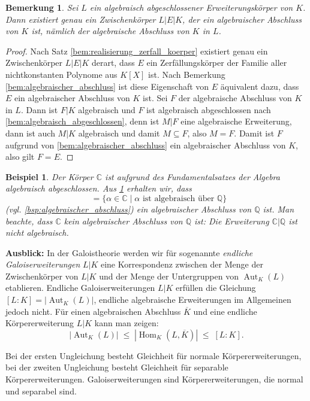 \documentclass[a4paper, twoside, 11pt, ngerman]{report}
\newcommand{\CC}{\mathds C}
\newcommand{\QQ}{\mathds Q}
\DeclareMathOperator{\alg}{alg}
\DeclareMathOperator{\Aut}{Aut}
\DeclareMathOperator{\Hom}{Hom}
\DeclareMathOperator{\QQalg}{\QQ^{\alg}}
\theoremstyle{definistyle}
\newtheorem{bem}[satz]{Bemerkung}
\newtheorem{bsp}[satz]{Beispiel}
\theoremstyle{remark}
\begin{document}
\begin{bem}\label{bem:einbettung_alg_abschluss}
Sei $L$ ein algebraisch abgeschlossener Erweiterungskörper von $K$. Dann existiert genau ein Zwischenkörper $L|E|K$, der ein algebraischer Abschluss von $K$ ist, nämlich der algebraische Abschluss von $K$ in $L$.
\end{bem}

\begin{proof}
Nach Satz \ref{bem:realisierung_zerfall_koerper} existiert genau ein Zwischenkörper $L|E|K$ derart, dass $E$ ein Zerfällungskörper der Familie aller nichtkonstanten Polynome aus $K[X]$ ist. Nach Bemerkung \ref{bem:algebraischer_abschluss} ist diese Eigenschaft von $E$ äquivalent dazu, dass $E$ ein algebraischer Abschluss von $K$ ist. 
Sei $F$ der algebraische Abschluss von $K$ in $L$. Dann ist $F|K$ algebraisch und $F$ ist algebraisch abgeschlossen nach \ref{bem:algebraisch_abgeschlossen}, denn ist $M|F$
eine algebraische Erweiterung, dann ist auch $M|K$ algebraisch und damit $M\subseteq F$,
also $M=F$. Damit ist $F$ aufgrund von \ref{bem:algebraischer_abschluss} ein algebraischer Abschluss von $K$, also gilt $F=E$.
\end{proof}

\begin{bsp}\label{bsp:kp_alg_zahlen_in_C}
Der Körper $\mathbb{C}$ ist aufgrund des Fundamentalsatzes der Algebra algebraisch abgeschlossen. Aus \ref{bem:einbettung_alg_abschluss} erhalten wir, dass   
\[\QQalg = \{\alpha \in \mathbb{C} \mid \alpha \text{ ist algebraisch über } \QQ\}\] (vgl. \ref{bsp:algebraischer_abschluss}) ein algebraischer Abschluss von $\QQ$ ist. Man beachte, dass $\CC$
kein algebraischer Abschluss von $\QQ$ ist: Die Erweiterung $\CC|\QQ$ ist nicht algebraisch.
\end{bsp}

\noindent\textbf{Ausblick:} In der Galoistheorie werden wir für sogenannte \emph{endliche Galoiserweiterungen} $L|K$ eine Korrespondenz zwischen der Menge der Zwischenkörper von $L|K$ und der Menge der Untergruppen von $\Aut_K(L)$ etablieren. Endliche Galoiserweiterungen $L|K$ erfüllen die Gleichung $[L:K] = |\Aut_K(L)|$, endliche algebraische Erweiterungen im Allgemeinen jedoch nicht.
Für einen algebraischen Abschluss $\overline{K}$ und eine endliche Körpererweiterung $L|K$ kann man zeigen:
\[
|\Aut_K(L)| \; \leq \; |\Hom_K(L,\overline{K})| \; \leq \; [L:K].
\]

Bei der ersten Ungleichung besteht Gleichheit für normale Körpererweiterungen,
bei der zweiten Ungleichung besteht Gleichheit für separable Körpererweiterungen. Galoiserweiterungen sind Körpererweiterungen, die normal und separabel sind.
\end{document}
